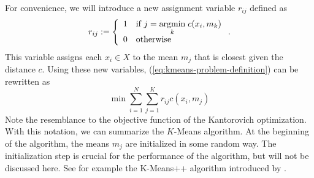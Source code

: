 For convenience, we will introduce a new assignment variable $r_{ij}$ defined as 
\begin{equation}
  \label{eq:define_r_kmeans}
  r_{ij}:= \left\{\begin{array}{ll} 1 & \text{if }j = \underset{k}{\operatorname{argmin}}\; c(x_i, m_k)\\0&\text{otherwise}\end{array}\right. .
\end{equation}
This variable assigns each $x_i\in X$ to the mean $m_j$ that is closest given the distance $c$.
Using these new variables, (\ref{eq:kmeans-problem-definition}) can be rewritten as
\begin{equation}
  \label{eq:kmeans-problem-with-r}
  \min \sum_{i=1}^N\sum_{j=1}^Kr_{ij}c(x_i, m_j)
\end{equation}
Note the resemblance to the objective function of the Kantorovich optimization.
With this notation, we can summarize the $K$-Means algorithm.
At the beginning of the algorithm, the means $m_j$ are initialized in some random way.
The initialization step is crucial for the performance of the algorithm, but will not be discussed here. See for example the K-Means++ algorithm introduced by \cite{Arthur2006}. 

